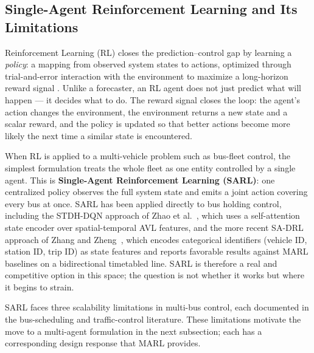 \subsection{Single-Agent Reinforcement Learning and Its Limitations}
Reinforcement Learning (RL) closes the prediction--control gap by learning a \textit{policy}: a mapping from observed system states to actions, optimized through trial-and-error interaction with the environment to maximize a long-horizon reward signal \cite{Momenikorbekandi2023Intelligent}. Unlike a forecaster, an RL agent does not just predict what will happen --- it decides what to do. The reward signal closes the loop: the agent's action changes the environment, the environment returns a new state and a scalar reward, and the policy is updated so that better actions become more likely the next time a similar state is encountered.

When RL is applied to a multi-vehicle problem such as bus-fleet control, the simplest formulation treats the whole fleet as one entity controlled by a single agent. This is \textbf{Single-Agent Reinforcement Learning (SARL)}: one centralized policy observes the full system state and emits a joint action covering every bus at once. SARL has been applied directly to bus holding control, including the STDH-DQN approach of Zhao et al.~\cite{Zhao2022STDH}, which uses a self-attention state encoder over spatial-temporal AVL features, and the more recent SA-DRL approach of Zhang and Zheng~\cite{Zhang2025SADRL}, which encodes categorical identifiers (vehicle ID, station ID, trip ID) as state features and reports favorable results against MARL baselines on a bidirectional timetabled line. SARL is therefore a real and competitive option in this space; the question is not whether it works but where it begins to strain.

SARL faces three scalability limitations in multi-bus control, each documented in the bus-scheduling and traffic-control literature. These limitations motivate the move to a multi-agent formulation in the next subsection; each has a corresponding design response that MARL provides.

